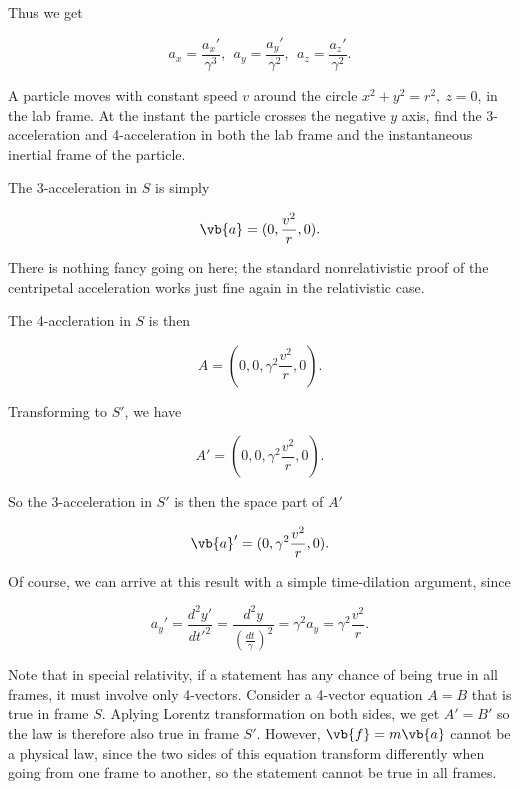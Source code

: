 \documentclass[english,a4paper,12pt]{report}
\begin{document}
Thus we get

\begin{equation}
    a_{x} = \frac{a_{x}' }{\gamma ^3 }, ~~ a_{y} = \frac{a_{y}' }{\gamma ^2}, ~~ a_{z} = \frac{a_{z}' }{\gamma ^2}.      
\end{equation}

{A particle moves with constant speed \(v\) around the circle \(x^2+y^2=r^2, ~z=0\), in the lab frame. At the instant the particle crosses the negative \(y\) axis, find the 3-acceleration and 4-acceleration in both the lab frame and the instantaneous inertial frame of the particle. }
{The 3-acceleration in \(S\) is simply

\begin{equation}
    \vb{a} = (0,\frac{v^2}{r}, 0 ).
\end{equation}

There is nothing fancy going on here; the standard nonrelativistic proof of the centripetal acceleration works just fine again in the relativistic case. 

The 4-accleration in \(S\) is then 

\begin{equation}
    A = (0,0,\gamma ^2\frac{v^2}{r}, 0 ).
\end{equation}

Transforming to \(S'\), we have 

\begin{equation}
    A' = (0,0, \gamma ^2 \frac{v^2}{r}, 0 ).
\end{equation}

So the 3-acceleration in \(S'\) is then the space part of \(A'\)

\begin{equation}
    \vb{a} ' = (0,\gamma ^2\frac{v^2}{r}, 0 ).
\end{equation}

Of course, we can arrive at this result with a simple time-dilation argument, since

\begin{equation}
    a_{y}' = \frac{d^2y'}{dt'^2} = \frac{d^2y}{(\frac{dt}{\gamma }) ^2} = \gamma ^2 a_{y} = \gamma ^2 \frac{v^2}{r}.     
\end{equation}
}

Note that in special relativity, if a statement has any chance of being true in all frames, it must involve only 4-vectors. Consider a 4-vector equation \(A = B\) that is true in frame \(S\). Aplying Lorentz transformation on both sides, we get \(A' = B'\) so the law is therefore also true in frame \(S'\). However, \(\vb{f} = m\vb{a} \) cannot be a physical law, since the two sides of this equation transform differently when going from one frame to another, so the statement cannot be true in all frames. 
\end{document}
